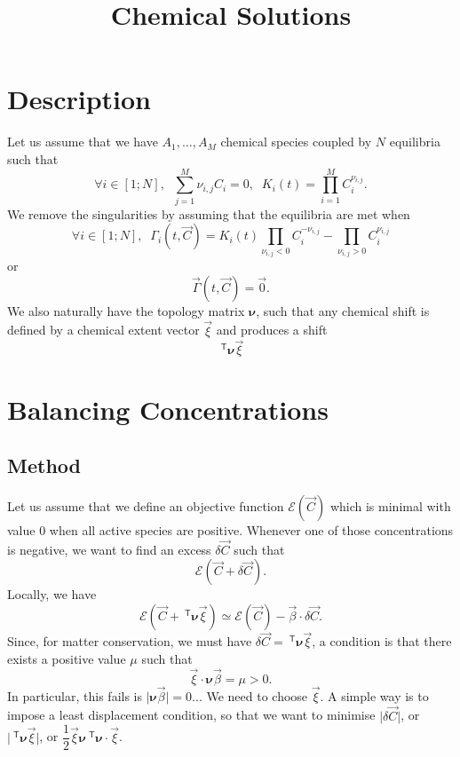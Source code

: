 \documentclass[aps]{revtex4}
\newcommand{\mymat}[1]{\bm{#1}}
\newcommand{\mytrn}[1]{~^{\mathsf{T}}{#1}}
\begin{document}
\title{Chemical Solutions}

\section{Description}
Let us assume that we have $A_1,\ldots,A_M$ chemical species coupled by
$N$ equilibria such that
\begin{equation}
	\forall i \in [1;N], \;\; \sum_{j=1}^{M} \nu_{i,j} C_i = 0, \;\; K_i(t) = \prod_{i=1}^{M} C_i^{\nu_{i,j}}.
\end{equation}
We remove the singularities by assuming that the equilibria are met when
\begin{equation}
	\forall i \in [1;N], \;\; \Gamma_i(t,\vec{C}) = K_i(t) \prod_{\nu_{i,j}<0}  C_i^{-\nu_{i,j}} -  \prod_{\nu_{i,j}>0} C_i^{\nu_{i,j}} 
\end{equation}
or
\begin{equation}
	\vec{\Gamma}(t,\vec{C}) = \vec{0}.
\end{equation}
We also naturally have the topology matrix $\mymat{\nu}$, such that
any chemical shift is defined by a  chemical extent vector $\vec{\xi}$ and
produces a shift
$$
	\mytrn{\mymat{\nu}}\vec{\xi}
$$

\section{Balancing Concentrations}
\subsection{Method}

Let us assume that we define an objective function $\mathcal{E}\left(\vec{C}\right)$ which is minimal with value 0 when all active species are positive. Whenever one of those concentrations is negative, we want to find an excess
$\delta\vec{C}$ such that
\begin{equation}
	\mathcal{E}\left(\vec{C}+\delta\vec{C}\right).
\end{equation}
Locally, we have
\begin{equation}
	\mathcal{E}\left(\vec{C}+\mytrn{\mymat{\nu}}\vec{\xi}\right) \simeq 
	\mathcal{E}\left(\vec{C}\right) - \vec{\beta}\cdot\delta\vec{C}.
\end{equation}
Since, for matter conservation, we must have $\delta\vec{C} = \mytrn{\mymat{\nu}}\vec{\xi}$, 
a condition is that there exists a positive value $\mu$ such that 
\begin{equation}
	\vec{\xi} \cdot \mymat{\nu} \vec{\beta} = \mu > 0 .
\end{equation}
In particular, this fails is $\vert\mymat{\nu} \vec{\beta}\vert=0$...
We need to choose $\vec{\xi}$. A simple way is to impose a least displacement condition, so
that we want to minimise $\vert\delta\vec{C}\vert$, or $\vert\mytrn{\mymat{\nu}}\vec{\xi}\vert$, or
$\dfrac{1}{2}\vec{\xi}\mymat{\nu}\mytrn{\mymat{\nu}}\cdot\vec{\xi}$.
\end{document}
